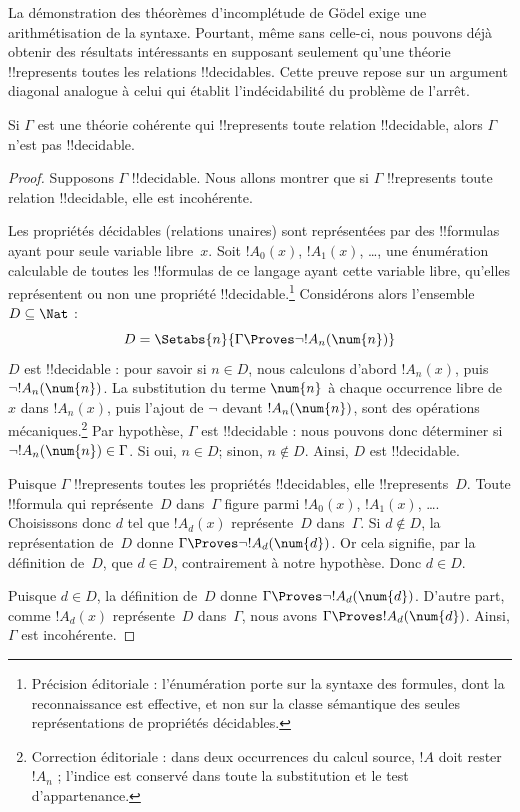 \documentclass[../../../include/open-logic-section]{subfiles}
\begin{document}


La démonstration des théorèmes d'incomplétude de Gödel exige une
arithmétisation de la syntaxe. Pourtant, même sans celle-ci, nous
pouvons déjà obtenir des résultats intéressants en supposant seulement
qu'une théorie !!{represents} toutes les relations !!{decidable}s.
Cette preuve repose sur un argument diagonal analogue à celui qui
établit l'indécidabilité du problème de l'arrêt.

\begin{thm}
Si $\Gamma$ est une théorie cohérente qui !!{represents} toute
relation !!{decidable}, alors $\Gamma$ n'est pas !!{decidable}.
\end{thm}

\begin{proof}
Supposons $\Gamma$ !!{decidable}. Nous allons montrer que si
$\Gamma$ !!{represents} toute relation !!{decidable}, elle est
incohérente.

Les propriétés décidables (relations unaires) sont représentées
par des !!{formula}s ayant pour seule variable libre~$x$. Soit
$!A_0(x)$, $!A_1(x)$, \dots, une énumération calculable de toutes
les !!{formula}s de ce langage ayant cette variable libre, qu'elles représentent ou non une propriété !!{decidable}.\footnote{Précision éditoriale : l'énumération porte sur la syntaxe des formules, dont la reconnaissance est effective, et non sur la classe sémantique des seules représentations de propriétés décidables.} Considérons alors l'ensemble $D\subseteq\Nat$ :
\[
D = \Setabs{n}{\Gamma \Proves \lnot !A_n(\num{n})}
\]
$D$ est !!{decidable} : pour savoir si $n\in D$, nous calculons
d'abord $!A_n(x)$, puis $\lnot !A_n(\num{n})$. La substitution du
terme $\num{n}$ à chaque occurrence libre de~$x$ dans $!A_n(x)$,
puis l'ajout de $\lnot$ devant $!A_n(\num{n})$, sont des opérations
mécaniques.\footnote{Correction éditoriale : dans deux occurrences du calcul source, $!A$ doit rester $!A_n$ ; l'indice est conservé dans toute la substitution et le test d'appartenance.} Par hypothèse, $\Gamma$ est !!{decidable} : nous pouvons
donc déterminer si $\lnot !A_n(\num{n})\in\Gamma$. Si oui,
$n\in D$; sinon, $n\notin D$. Ainsi, $D$ est !!{decidable}.

Puisque $\Gamma$ !!{represents} toutes les propriétés !!{decidable}s,
elle !!{represents}~$D$. Toute !!{formula} qui représente~$D$
dans~$\Gamma$ figure parmi $!A_0(x)$, $!A_1(x)$, \dots.
Choisissons donc $d$ tel que $!A_d(x)$ représente~$D$ dans~$\Gamma$.
Si $d\notin D$, la représentation de~$D$ donne
$\Gamma\Proves\lnot !A_d(\num{d})$. Or cela signifie, par la définition
de~$D$, que $d\in D$, contrairement à notre hypothèse. Donc
$d\in D$.

Puisque $d\in D$, la définition de~$D$ donne
$\Gamma\Proves\lnot !A_d(\num{d})$. D'autre part, comme
$!A_d(x)$ représente~$D$ dans~$\Gamma$, nous avons
$\Gamma\Proves !A_d(\num{d})$. Ainsi, $\Gamma$ est incohérente.
\end{proof}
\end{document}
